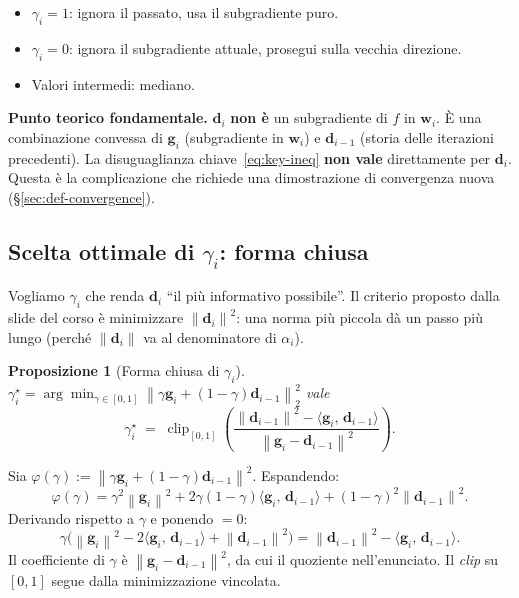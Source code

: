 \documentclass[11pt,a4paper]{article}
\newcommand{\norm}[1]{\left\|#1\right\|}
\newcommand{\inner}[2]{\langle #1,\,#2\rangle}
\newcommand{\bw}{\mathbf{w}}
\newcommand{\bg}{\mathbf{g}}
\newcommand{\bd}{\mathbf{d}}
\newtheorem{proposition}[theorem]{Proposizione}
\theoremstyle{definition}
\begin{document}
\begin{itemize}[leftmargin=*]
\item $\gamma_i = 1$: ignora il passato, usa il subgradiente puro.
\item $\gamma_i = 0$: ignora il subgradiente attuale, prosegui sulla vecchia direzione.
\item Valori intermedi: mediano.
\end{itemize}

\begin{tcolorbox}[warning]
\textbf{Punto teorico fondamentale.} $\bd_i$ \textbf{non è} un subgradiente di $f$ in $\bw_i$. È una combinazione convessa di $\bg_i$ (subgradiente in $\bw_i$) e $\bd_{i-1}$ (storia delle iterazioni precedenti). La disuguaglianza chiave~\eqref{eq:key-ineq} \textbf{non vale} direttamente per $\bd_i$. Questa è la complicazione che richiede una dimostrazione di convergenza nuova (\S\ref{sec:def-convergence}).
\end{tcolorbox}

\subsection{Scelta ottimale di $\gamma_i$: forma chiusa}

Vogliamo $\gamma_i$ che renda $\bd_i$ ``il più informativo possibile''. Il criterio proposto dalla slide del corso è minimizzare $\norm{\bd_i}^2$: una norma più piccola dà un passo più lungo (perché $\norm{\bd_i}$ va al denominatore di $\alpha_i$).

\begin{proposition}[Forma chiusa di $\gamma_i$]
$\displaystyle\gamma_i^\star = \arg\min_{\gamma\in[0,1]}\norm{\gamma\bg_i + (1-\gamma)\bd_{i-1}}_2^2$ vale
\begin{equation}
\label{eq:gamma-closed}
\gamma_i^\star \;=\; \operatorname{clip}_{[0,1]}\!\left(\frac{\norm{\bd_{i-1}}^2 - \inner{\bg_i}{\bd_{i-1}}}{\norm{\bg_i-\bd_{i-1}}^2}\right).
\end{equation}
\end{proposition}

\begin{tcolorbox}[proofbox]
Sia $\varphi(\gamma) := \norm{\gamma\bg_i + (1-\gamma)\bd_{i-1}}^2$. Espandendo:
\[
\varphi(\gamma) = \gamma^2\norm{\bg_i}^2 + 2\gamma(1-\gamma)\inner{\bg_i}{\bd_{i-1}} + (1-\gamma)^2\norm{\bd_{i-1}}^2.
\]
Derivando rispetto a $\gamma$ e ponendo $=0$:
\[
\gamma\Big(\norm{\bg_i}^2 - 2\inner{\bg_i}{\bd_{i-1}} + \norm{\bd_{i-1}}^2\Big) = \norm{\bd_{i-1}}^2 - \inner{\bg_i}{\bd_{i-1}}.
\]
Il coefficiente di $\gamma$ è $\norm{\bg_i - \bd_{i-1}}^2$, da cui il quoziente nell'enunciato. Il \emph{clip} su $[0,1]$ segue dalla minimizzazione vincolata.
\end{tcolorbox}
\end{document}
